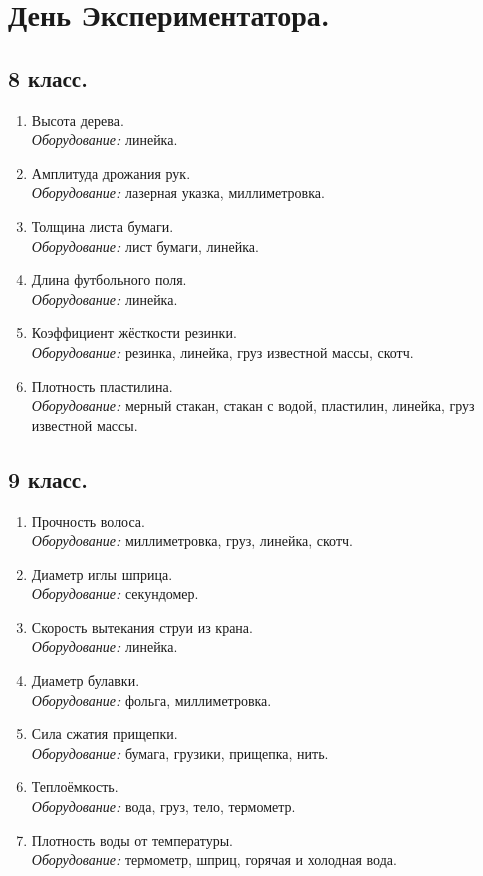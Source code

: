 \documentclass[11pt]{article}
\newlength{\h}
\newlength{\x}
\begin{document}
\section{День Экспериментатора.}
\label{sec:day_exp}

\subsection{8 класс.}
\label{sec:day_exp8}
\begin{enumerate}
\item Высота дерева.\\
  \emph{Оборудование:} линейка.
\item Амплитуда дрожания рук. \\
  \emph{Оборудование:} лазерная указка, миллиметровка.
\item Толщина листа бумаги. \\
  \emph{Оборудование:} лист бумаги, линейка.
\item Длина футбольного поля. \\
  \emph{Оборудование:} линейка.
\item Коэффициент жёсткости резинки. \\
  \emph{Оборудование:} резинка, линейка, груз известной массы, скотч.
\item Плотность пластилина. \\
  \emph{Оборудование:} мерный стакан, стакан с водой, пластилин,
  линейка, груз известной массы.
\end{enumerate}

\subsection{9 класс.}
\label{sec:day_exp9}
\begin{enumerate}
\item Прочность волоса. \\
  \emph{Оборудование:} миллиметровка, груз, линейка, скотч.
\item Диаметр иглы шприца.\\ 
  \emph{Оборудование:} секундомер.
\item Скорость вытекания струи из крана. \\
  \emph{Оборудование:} линейка.
\item Диаметр булавки.\\
  \emph{Оборудование:} фольга, миллиметровка.
\item Сила сжатия прищепки. \\
  \emph{Оборудование:} бумага, грузики, прищепка, нить.
\item Теплоёмкость.\\
  \emph{Оборудование:} вода, груз, тело, термометр.
\item Плотность воды от температуры. \\
  \emph{Оборудование:} термометр, шприц, горячая и холодная вода.
\end{enumerate}
\end{document}
